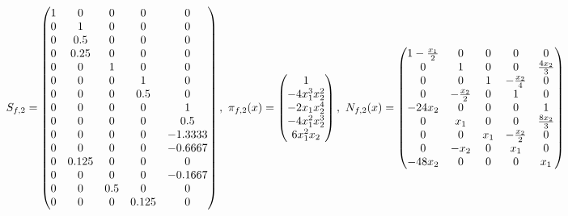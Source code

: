 \documentclass[fleqn]{article}
\begin{document}
\begin{align}
    S_{f,2} = \pmqty{ 1 & 0 & 0 & 0 & 0 \\ 0 & 1 & 0 & 0 & 0 \\ 0 & 0.5 & 0 & 0 & 0 \\ 0 & 0.25 & 0 & 0 & 0 \\ 0 & 0 & 1 & 0 & 0 \\ 0 & 0 & 0 & 1 & 0 \\ 0 & 0 & 0 & 0.5 & 0 \\ 0 & 0 & 0 & 0 & 1 \\ 0 & 0 & 0 & 0 & 0.5 \\ 0 & 0 & 0 & 0 & -1.3333 \\ 0 & 0 & 0 & 0 & -0.6667 \\ 0 & 0.125 & 0 & 0 & 0 \\ 0 & 0 & 0 & 0 & -0.1667 \\ 0 & 0 & 0.5 & 0 & 0 \\ 0 & 0 & 0 & 0.125 & 0 }
    ,~
    \pi_{f,2}(x) = \pmqty{
        1                \\
        -4x_{1}^3x_{2}^2 \\
        -2x_{1}x_{2}^4   \\
        -4x_{1}^2x_{2}^3 \\
        6x_{1}^2x_{2}    \\
    }
    ,~
    N_{f,2}(x) = \pmqty{
        1-\frac{x_{1}}{2} & 0                & 0     & 0                & 0                \\
        0                 & 1                & 0     & 0                & \frac{4x_{2}}{3} \\
        0                 & 0                & 1     & -\frac{x_{2}}{4} & 0                \\
        0                 & -\frac{x_{2}}{2} & 0     & 1                & 0                \\
        -24x_{2}          & 0                & 0     & 0                & 1                \\
        0                 & x_{1}            & 0     & 0                & \frac{8x_{2}}{3} \\
        0                 & 0                & x_{1} & -\frac{x_{2}}{2} & 0                \\
        0                 & -x_{2}           & 0     & x_{1}            & 0                \\
        -48x_{2}          & 0                & 0     & 0                & x_{1}            \\
    }
\end{align}
\end{document}
